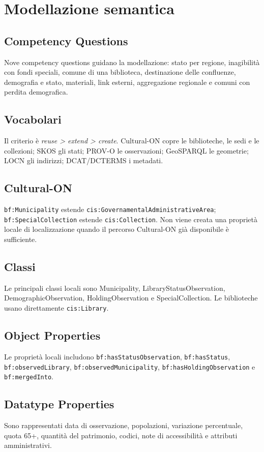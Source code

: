 \documentclass[11pt,a4paper]{article}
\begin{document}
\section{Modellazione semantica}
\subsection{Competency Questions}
Nove competency questions guidano la modellazione: stato per regione, inagibilità con fondi speciali, comune di una biblioteca, destinazione delle confluenze, demografia e stato, materiali, link esterni, aggregazione regionale e comuni con perdita demografica.

\subsection{Vocabolari}
Il criterio è \textit{reuse > extend > create}. Cultural-ON copre le biblioteche, le sedi e le collezioni; SKOS gli stati; PROV-O le osservazioni; GeoSPARQL le geometrie; LOCN gli indirizzi; DCAT/DCTERMS i metadati.

\subsection{Cultural-ON}
\texttt{bf:Municipality} estende \nolinkurl{cis:GovernamentalAdministrativeArea}; \texttt{bf:SpecialCollection} estende \texttt{cis:Collection}. Non viene creata una proprietà locale di localizzazione quando il percorso Cultural-ON già disponibile è sufficiente.

\subsection{Classi}
Le principali classi locali sono Municipality, LibraryStatusObservation, DemographicObservation, HoldingObservation e SpecialCollection. Le biblioteche usano direttamente \texttt{cis:Library}.

\subsection{Object Properties}
Le proprietà locali includono \texttt{bf:hasStatusObservation}, \texttt{bf:hasStatus}, \texttt{bf:observedLibrary}, \texttt{bf:observedMunicipality}, \texttt{bf:hasHoldingObservation} e \texttt{bf:mergedInto}.

\subsection{Datatype Properties}
Sono rappresentati data di osservazione, popolazioni, variazione percentuale, quota 65+, quantità del patrimonio, codici, note di accessibilità e attributi amministrativi.
\end{document}
